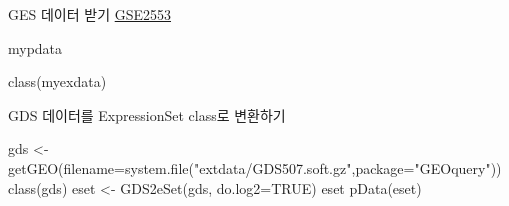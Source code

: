 \documentclass[
]{book}
\newenvironment{Shaded}{\begin{snugshade}}{\end{snugshade}}
\newcommand{\AttributeTok}[1]{\textcolor[rgb]{0.77,0.63,0.00}{#1}}
\newcommand{\ConstantTok}[1]{\textcolor[rgb]{0.00,0.00,0.00}{#1}}
\newcommand{\DecValTok}[1]{\textcolor[rgb]{0.00,0.00,0.81}{#1}}
\newcommand{\DocumentationTok}[1]{\textcolor[rgb]{0.56,0.35,0.01}{\textbf{\textit{#1}}}}
\newcommand{\FunctionTok}[1]{\textcolor[rgb]{0.00,0.00,0.00}{#1}}
\newcommand{\NormalTok}[1]{#1}
\newcommand{\OtherTok}[1]{\textcolor[rgb]{0.56,0.35,0.01}{#1}}
\newcommand{\SpecialCharTok}[1]{\textcolor[rgb]{0.00,0.00,0.00}{#1}}
\newcommand{\StringTok}[1]{\textcolor[rgb]{0.31,0.60,0.02}{#1}}
\begin{document}
GES 데이터 받기 \href{https://www.ncbi.nlm.nih.gov/geo/query/acc.cgi?acc=GSE2553}{GSE2553}

\begin{Shaded}
\end{Shaded}

\begin{Shaded}
\begin{Highlighting}[]
\NormalTok{mypdata}

\FunctionTok{class}\NormalTok{(myexdata)}
\end{Highlighting}
\end{Shaded}

GDS 데이터를 ExpressionSet class로 변환하기

\begin{Shaded}
\begin{Highlighting}[]
\NormalTok{gds }\OtherTok{\textless{}{-}} \FunctionTok{getGEO}\NormalTok{(}\AttributeTok{filename=}\FunctionTok{system.file}\NormalTok{(}\StringTok{"extdata/GDS507.soft.gz"}\NormalTok{,}\AttributeTok{package=}\StringTok{"GEOquery"}\NormalTok{))}
\FunctionTok{class}\NormalTok{(gds)}
\NormalTok{eset }\OtherTok{\textless{}{-}} \FunctionTok{GDS2eSet}\NormalTok{(gds, }\AttributeTok{do.log2=}\ConstantTok{TRUE}\NormalTok{)}
\NormalTok{eset}
\FunctionTok{pData}\NormalTok{(eset)}
\end{Highlighting}
\end{Shaded}
\end{document}
